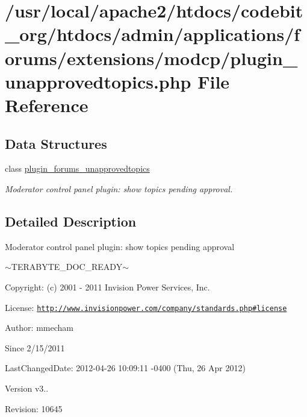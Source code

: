 \hypertarget{plugin__unapprovedtopics_8php}{\section{/usr/local/apache2/htdocs/codebit\-\_\-org/htdocs/admin/applications/forums/extensions/modcp/plugin\-\_\-unapprovedtopics.php File Reference}
\label{plugin__unapprovedtopics_8php}
}
\subsection*{Data Structures}
\begin{DoxyCompactItemize}
\item 
class \hyperlink{classplugin__forums__unapprovedtopics}{plugin\-\_\-forums\-\_\-unapprovedtopics}
\begin{DoxyCompactList}\small\item\em Moderator control panel plugin\-: show topics pending approval. \end{DoxyCompactList}\end{DoxyCompactItemize}


\subsection{Detailed Description}
\begin{DoxyVerb}  Moderator control panel plugin: show topics pending approval
\end{DoxyVerb}
 $\sim$\-T\-E\-R\-A\-B\-Y\-T\-E\-\_\-\-D\-O\-C\-\_\-\-R\-E\-A\-D\-Y$\sim$ \begin{DoxyParagraph}{Copyright\-:}
(c) 2001 -\/ 2011 Invision Power Services, Inc.
\end{DoxyParagraph}
\begin{DoxyParagraph}{License\-:}
\href{http://www.invisionpower.com/company/standards.php#license}{\tt http\-://www.\-invisionpower.\-com/company/standards.\-php\#license}
\end{DoxyParagraph}
\begin{DoxyParagraph}{Author\-:}
mmecham 
\end{DoxyParagraph}
\begin{DoxySince}{Since}
2/15/2011 
\end{DoxySince}
\begin{DoxyParagraph}{Last\-Changed\-Date\-:}
2012-\/04-\/26 10\-:09\-:11 -\/0400 (Thu, 26 Apr 2012) 
\end{DoxyParagraph}
\begin{DoxyVersion}{Version}
v3.. 
\end{DoxyVersion}
\begin{DoxyParagraph}{Revision\-:}
10645 
\end{DoxyParagraph}
